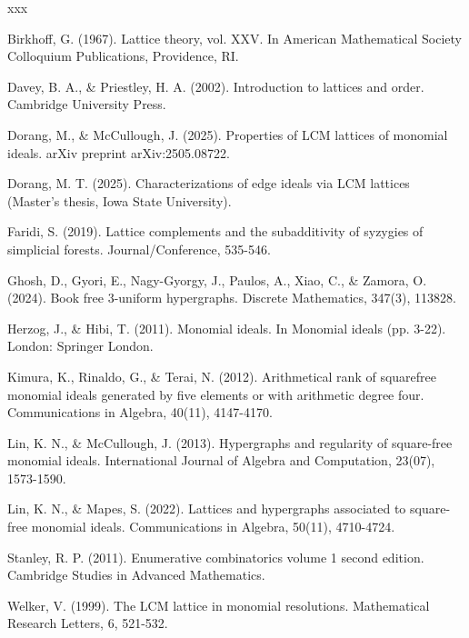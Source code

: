 \documentclass[11pt]{amsart}
\theoremstyle{plain}
\numberwithin{lemma}{\DefaultNumberTheoremWithin}
\numberwithin{claim}{\DefaultNumberTheoremWithin}
\numberwithin{theorem}{\DefaultNumberTheoremWithin}
\numberwithin{corollary}{\DefaultNumberTheoremWithin}
\numberwithin{proposition}{\DefaultNumberTheoremWithin}
\numberwithin{conjecture}{\DefaultNumberTheoremWithin}
\theoremstyle{definition}
\numberwithin{definition}{\DefaultNumberTheoremWithin}
\theoremstyle{definition}
\numberwithin{question}{\DefaultNumberTheoremWithin}
\theoremstyle{definition}
\numberwithin{problem}{\DefaultNumberTheoremWithin}
\theoremstyle{remark}
\numberwithin{remark}
     {\DefaultNumberTheoremWithin}
\theoremstyle{remark}
\numberwithin{example}{\DefaultNumberTheoremWithin}
\begin{document}
%
\begin{thebibliography}{xxx}

 Birkhoff, G. (1967). Lattice theory, vol. XXV. In American Mathematical Society Colloquium Publications, Providence, RI.

 Davey, B. A., \& Priestley, H. A. (2002). Introduction to lattices and order. Cambridge University Press.

 Dorang, M., \& McCullough, J. (2025). Properties of LCM lattices of monomial ideals. arXiv preprint arXiv:2505.08722.

 Dorang, M. T. (2025). Characterizations of edge ideals via LCM lattices (Master's thesis, Iowa State University).

 Faridi, S. (2019). Lattice complements and the subadditivity of syzygies of simplicial forests. Journal/Conference, 535-546.

 Ghosh, D., Gyori, E., Nagy-Gyorgy, J., Paulos, A., Xiao, C., \& Zamora, O. (2024). Book free 3-uniform hypergraphs. Discrete Mathematics, 347(3), 113828.

 Herzog, J., \& Hibi, T. (2011). Monomial ideals. In Monomial ideals (pp. 3-22). London: Springer London.

 Kimura, K., Rinaldo, G., \& Terai, N. (2012). Arithmetical rank of squarefree monomial ideals generated by five elements or with arithmetic degree four. Communications in Algebra, 40(11), 4147-4170.

 Lin, K. N., \& McCullough, J. (2013). Hypergraphs and regularity of square-free monomial ideals. International Journal of Algebra and Computation, 23(07), 1573-1590.

 Lin, K. N., \& Mapes, S. (2022). Lattices and hypergraphs associated to square-free monomial ideals. Communications in Algebra, 50(11), 4710-4724.

 Stanley, R. P. (2011). Enumerative combinatorics volume 1 second edition. Cambridge Studies in Advanced Mathematics.

 Welker, V. (1999). The LCM lattice in monomial resolutions. Mathematical Research Letters, 6, 521-532.



\end{thebibliography}
\end{document}
